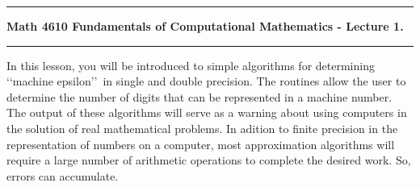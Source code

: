 \documentclass[10pt,fleqn]{article}
\begin{document}
\vskip0.1in\hrule\vskip0.1in
\noindent
{\bf Math 4610 Fundamentals of Computational Mathematics  - Lecture 1.} 
\vskip0.1in\hrule\vskip0.1in
\noindent
In this lesson, you will be introduced to simple algorithms for determining
\lq\lq machine epsilon\rq\rq\ in single and double precision. The routines allow
the user to determine the number of digits that can be represented in a machine
number. The output of these algorithms will serve as a warning about using
computers in the solution of real mathematical problems. In adition to finite
precision in the representation of numbers on a computer, most approximation
algorithms will require a large number of arithmetic operations to complete the
desired work. So, errors can accumulate.
\end{document}
